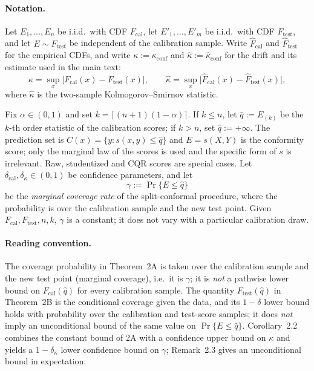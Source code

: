 \paragraph{Notation.}
Let $E_1,\dots,E_n$ be i.i.d.\ with CDF $F_{\mathrm{cal}}$, let
$E'_1,\dots,E'_m$ be i.i.d.\ with CDF $F_{\mathrm{test}}$, and let
$E\sim F_{\mathrm{test}}$ be independent of the calibration sample. Write
$\hat F_{\mathrm{cal}}$ and $\hat F_{\mathrm{test}}$ for the empirical CDFs, and
write $\kappa:=\kappa_{\mathrm{conf}}$ and $\hat\kappa:=\hat\kappa_{\mathrm{conf}}$
for the drift and its estimate used in the main text:
\[
\kappa=\sup_x\bigl|F_{\mathrm{cal}}(x)-F_{\mathrm{test}}(x)\bigr|,
\qquad
\hat\kappa=\sup_x\bigl|\hat F_{\mathrm{cal}}(x)-\hat F_{\mathrm{test}}(x)\bigr|,
\]
where $\hat\kappa$ is the two-sample Kolmogorov--Smirnov statistic.

Fix $\alpha\in(0,1)$ and set $k=\lceil(n+1)(1-\alpha)\rceil$. If $k\le n$, let
$\hat q:=E_{(k)}$ be the $k$-th order statistic of the calibration scores; if
$k>n$, set $\hat q:=+\infty$. The prediction set is
$C(x)=\{y:s(x,y)\le\hat q\}$ and $E=s(X,Y)$ is the conformity score; only the
marginal law of the scores is used and the specific form of $s$ is irrelevant.
Raw, studentized and CQR scores are special cases. Let
$\delta_{\mathrm{cal}},\delta_\kappa\in(0,1)$ be confidence parameters, and let
\[
\gamma:=\Pr\{E\le\hat q\}
\]
be the \emph{marginal coverage rate} of the split-conformal procedure, where the
probability is over the calibration sample and the new test point. Given
$F_{\mathrm{cal}},F_{\mathrm{test}},n,k$, $\gamma$ is a constant; it does not vary
with a particular calibration draw.

\paragraph{Reading convention.}
The coverage probability in Theorem~2A is taken over the calibration sample and the
new test point (marginal coverage), i.e.\ it is $\gamma$; it is \emph{not} a
pathwise lower bound on $F_{\mathrm{cal}}(\hat q)$ for every calibration sample.
The quantity $F_{\mathrm{test}}(\hat q)$ in Theorem~2B is the conditional coverage
given the data, and its $1-\delta$ lower bound holds with probability over the
calibration and test-score samples; it does \emph{not} imply an unconditional bound
of the same value on $\Pr\{E\le\hat q\}$. Corollary~2.2 combines the constant bound
of 2A with a confidence upper bound on $\kappa$ and yields a $1-\delta_\kappa$ lower
confidence bound on $\gamma$; Remark~2.3 gives an unconditional bound in
expectation.

